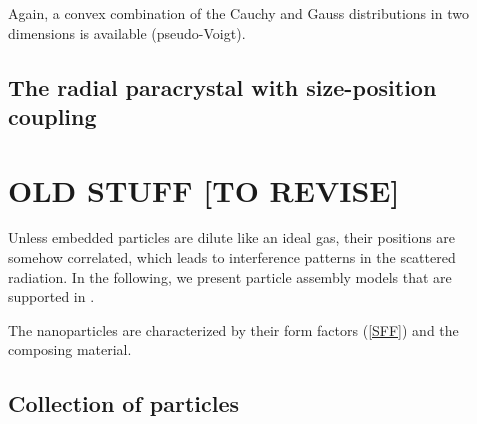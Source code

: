 Again, a convex combination of the Cauchy and Gauss distributions in two dimensions is available (pseudo-Voigt).

\subsection{The radial paracrystal with size-position coupling} \label{sec:sect:sscaparacrystal}

\section{OLD STUFF [TO REVISE]}

Unless embedded particles are dilute like an ideal gas,
their positions are somehow correlated,
which leads to interference patterns in the scattered radiation.
In the following,
we present particle assembly models that are supported in \BornAgain.


The nanoparticles are characterized by their form factors
(\cref{SFF}) and the composing material.



\subsection{Collection of particles} \label{sec:sect:interf}

